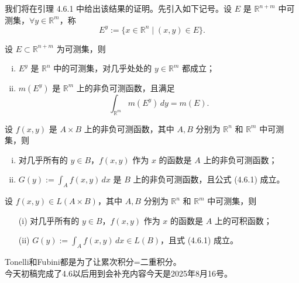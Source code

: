 \documentclass[lang=cn,10pt]{elegantbook}
\begin{document}
我们将在引理 4.6.1 中给出该结果的证明。先引入如下记号。设 $E$ 是 $\mathbb{R}^{n+m}$ 中可测集，$\forall y \in \mathbb{R}^m$，称
\[
E^y := \{ x \in \mathbb{R}^n \mid (x,y) \in E\}.
\]
\begin{lemma}[4.6.1]
设 $E \subset \mathbb{R}^{n+m}$ 为可测集，则
\begin{enumerate}[(i)]
  \item $E^y$ 是 $\mathbb{R}^n$ 中的可测集，对几乎处处的 $y \in \mathbb{R}^m$ 都成立；
  \item $m(E^y)$ 是 $\mathbb{R}^m$ 上的非负可测函数，且满足
  \[
  \int_{\mathbb{R}^m} m(E^y)\, dy = m(E).
  \]
\end{enumerate}
\end{lemma}
\begin{theorem}[4.6.1 Tonelli]
设 $f(x,y)$ 是 $A \times B$ 上的非负可测函数，其中 $A, B$ 分别为 $\mathbb{R}^n$ 和 $\mathbb{R}^m$ 中可测集，则

\begin{enumerate}[(i)]
\item 对几乎所有的 $y \in B$，$f(x,y)$ 作为 $x$ 的函数是 $A$ 上的非负可测函数；
\item $G(y) := \int_A f(x,y)\,dx$ 是 $B$ 上的非负可测函数，且公式 (4.6.1) 成立。
\end{enumerate}
\end{theorem}
\begin{theorem}[4.6.2 Fubini]
设 $f(x,y) \in L(A \times B)$，其中 $A,B$ 分别为 $\mathbb{R}^n$ 和 $\mathbb{R}^m$ 中可测集，则

\begin{itemize}
  \item[(i)] 对几乎所有的 $y \in B$，$f(x,y)$ 作为 $x$ 的函数是 $A$ 上的可积函数；
  \item[(ii)] $G(y) := \int_A f(x,y)\,dx \in L(B)$，且式 (4.6.1) 成立。
\end{itemize}
\end{theorem}
Tonelli和Fubini都是为了让累次积分=二重积分。\\
今天初稿完成了4.6以后用到会补充内容今天是2025年8月16号。
\end{document}
